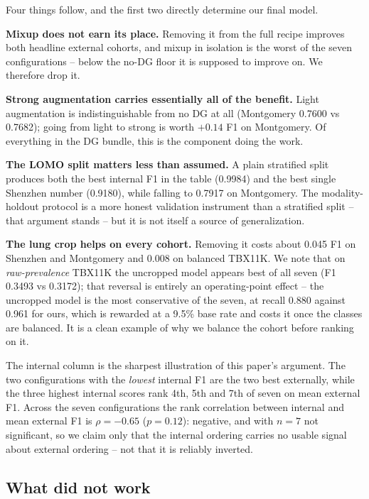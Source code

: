 \documentclass[runningheads]{llncs}
\begin{document}
Four things follow, and the first two directly determine our final model.

\textbf{Mixup does not earn its place.} Removing it from the full recipe
improves both headline external cohorts, and mixup in isolation is the
worst of the seven configurations -- below the no-DG floor it is supposed
to improve on. We therefore drop it.

\textbf{Strong augmentation carries essentially all of the benefit.} Light
augmentation is indistinguishable from no DG at all (Montgomery 0.7600 vs
0.7682); going from light to strong is worth $+0.14$ F1 on Montgomery. Of
everything in the DG bundle, this is the component doing the work.

\textbf{The LOMO split matters less than assumed.} A plain stratified split
produces both the best internal F1 in the table (0.9984) and the best
single Shenzhen number (0.9180), while falling to 0.7917 on Montgomery. The
modality-holdout protocol is a more honest validation instrument than a
stratified split -- that argument stands -- but it is not itself a source
of generalization.

\textbf{The lung crop helps on every cohort.} Removing it costs about 0.045
F1 on Shenzhen and Montgomery and 0.008 on balanced TBX11K. We note that on
\emph{raw-prevalence} TBX11K the uncropped model appears best of all seven
(F1 0.3493 vs 0.3172); that reversal is entirely an operating-point effect
-- the uncropped model is the most conservative of the seven, at recall
0.880 against 0.961 for ours, which is rewarded at a 9.5\% base rate and
costs it once the classes are balanced. It is a clean example of why we
balance the cohort before ranking on it.

The internal column is the sharpest illustration of this paper's argument.
The two configurations with the \emph{lowest} internal F1 are the two best
externally, while the three highest internal scores rank 4th, 5th and 7th
of seven on mean external F1. Across the seven configurations the rank
correlation between internal and mean external F1 is $\rho=-0.65$
($p=0.12$): negative, and with $n=7$ not significant, so we claim only that
the internal ordering carries no usable signal about external ordering --
not that it is reliably inverted.

\subsection{What did not work}
\label{sec:negative}
\end{document}
